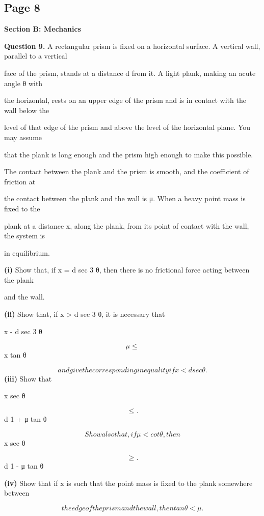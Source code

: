 \documentclass[12pt]{article}
\begin{document}
\subsection*{Page 8}
\begin{flushleft}
\bigskip\textbf{Section B: Mechanics}\par
\bigskip\textbf{Question 9.} A rectangular prism is fixed on a horizontal surface. A vertical wall, parallel to a vertical\par
face of the prism, stands at a distance d from it. A light plank, making an acute angle θ with\par
the horizontal, rests on an upper edge of the prism and is in contact with the wall below the\par
level of that edge of the prism and above the level of the horizontal plane. You may assume\par
that the plank is long enough and the prism high enough to make this possible.\par
The contact between the plank and the prism is smooth, and the coefficient of friction at\par
the contact between the plank and the wall is μ. When a heavy point mass is fixed to the\par
plank at a distance x, along the plank, from its point of contact with the wall, the system is\par
in equilibrium.\par
\textbf{(i)} Show that, if x = d sec 3 θ, then there is no frictional force acting between the plank\par
and the wall.\par
\textbf{(ii)} Show that, if x > d sec 3 θ, it is necessary that\par
x - d sec 3 θ\par
\[μ \leq\]
x tan θ\par
\[and give the corresponding inequality if x < d sec θ.\]
\textbf{(iii)} Show that\par
x sec θ\par
\[\leq .\]
d 1 + μ tan θ\par
\[Show also that, if μ < cot θ, then\]
x sec θ\par
\[\geq .\]
d 1 - μ tan θ\par
\textbf{(iv)} Show that if x is such that the point mass is fixed to the plank somewhere between\par
\[the edge of the prism and the wall, then tan θ < μ.\]
\end{flushleft}
\end{document}

